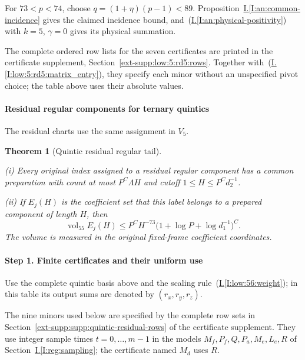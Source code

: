 \documentclass[11pt]{amsart}
\newtheorem{theorem}{Theorem}[section]
\theoremstyle{definition}
\theoremstyle{remark}
\numberwithin{equation}{section}
\newcommand{\partIref}[1]{\hyperref[I:#1]{I.\ref*{I:#1}}}
\newcommand{\partIeqref}[1]{\textup{(\partIref{#1})}}
\begin{document}
For $73<p<74$, choose $q=(1+\eta)(p-1)<89$. Proposition~\partIref{an:common-incidence} gives the claimed incidence bound, and~\partIeqref{an:physical-positivity} with $k=5$, $\gamma=0$ gives its physical summation.

The complete ordered row lists for the seven certificates are printed in the certificate supplement, Section~\ref{ext-supp:low:5:rd5:rows}. Together with~\partIeqref{low:5:rd5:matrix_entry}, they specify each minor without an unspecified pivot choice; the table above uses their absolute values.

\paragraph{Residual regular components for ternary quintics}
The residual charts use the same assignment in $V_5$.

\begin{theorem}[Quintic residual regular tail]\label{low:5:qrr:tail}

\noindent\textup{(i)} Every original index assigned to a residual regular component has a common preparation with count at most $P^C\Lambda H$ and cutoff $1\le H\le P^Cd_2^{-1}$.

\noindent\textup{(ii)} If $E_j(H)$ is the coefficient set that this label belongs to a prepared component of length $H$, then
\[
\operatorname{vol}_{55} E_j(H)\le P^C H^{-73}\bigl(1+\log P+\log d_1^{-1}\bigr)^C.
\]
The volume is measured in the original fixed-frame coefficient coordinates.
\end{theorem}

\paragraph{Step 1. Finite certificates and their uniform use}
Use the complete quintic basis above and the scaling rule~\partIeqref{low:56:weight}; in this table its output sums are denoted by $(r_x,r_y,r_z)$.

The nine minors used below are specified by the complete row sets in Section~\ref{ext-supp:supp:quintic-residual-rows} of the certificate supplement. They use integer sample times $t=0,\ldots,m-1$ in the models $M_f,P_f,Q,P_a,M_e,L_e,R$ of Section~\partIref{reg:sampling}; the certificate named $M_d$ uses $R$.
\end{document}
